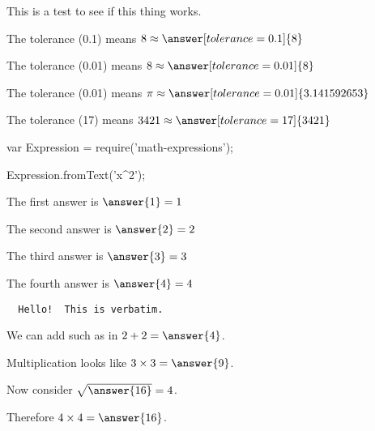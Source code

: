 \documentclass{ximera}
\begin{document}
This is a test to see if this thing works.

\begin{problem}
  The tolerance (0.1) means $8 \approx \answer[tolerance=0.1]{8}$
\end{problem}

\begin{problem}
  The tolerance (0.01) means $8 \approx \answer[tolerance=0.01]{8}$
\end{problem}

\begin{problem}
  The tolerance (0.01) means $\pi \approx \answer[tolerance=0.01]{3.141592653}$
\end{problem}

\begin{problem}
  The tolerance (17) means $3421 \approx \answer[tolerance=17]{3421}$
\end{problem}

\begin{code}
  var Expression = require('math-expressions');

  Expression.fromText('x^2');
\end{code}

\begin{shuffle}
  \begin{problem}
    The first answer is $\answer{1} = 1$
  \end{problem}

  \begin{problem}
    The second answer is $\answer{2} = 2$
  \end{problem}

  \begin{problem}
    The third answer is $\answer{3} = 3$
  \end{problem}

  \begin{problem}
    The fourth answer is $\answer{4} = 4$

  \end{problem}
\end{shuffle}

\begin{verbatim}
  Hello!  This is verbatim.
\end{verbatim}

\begin{problem}
  We can add such as in $2 + 2 = \answer{4}$.
  
  \begin{problem}
    Multiplication looks like $3 \times 3 = \answer{9}$.
    
    \begin{problem}
      Now consider $\sqrt{\answer{16}} = 4$.
      
      \begin{problem}
        Therefore $4 \times 4 = \answer{16}$.
      \end{problem}
    \end{problem}
  \end{problem}
\end{problem}
\end{document}
